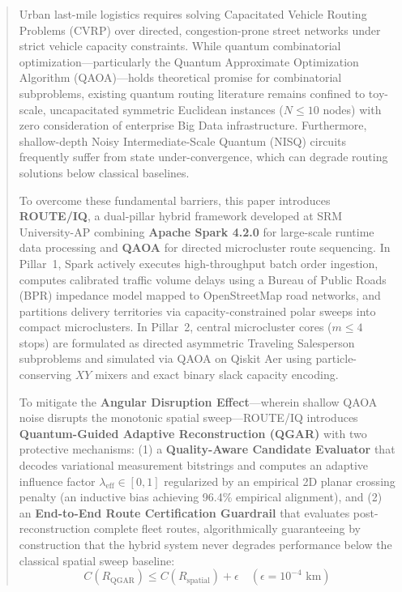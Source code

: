 \documentclass[journal,10pt]{IEEEtran}
\begin{document}
\begin{abstract}
Urban last-mile logistics requires solving Capacitated Vehicle Routing Problems (CVRP) over directed, congestion-prone street networks under strict vehicle capacity constraints. While quantum combinatorial optimization---particularly the Quantum Approximate Optimization Algorithm (QAOA)---holds theoretical promise for combinatorial subproblems, existing quantum routing literature remains confined to toy-scale, uncapacitated symmetric Euclidean instances ($N \le 10$ nodes) with zero consideration of enterprise Big Data infrastructure. Furthermore, shallow-depth Noisy Intermediate-Scale Quantum (NISQ) circuits frequently suffer from state under-convergence, which can degrade routing solutions below classical baselines. 

To overcome these fundamental barriers, this paper introduces \textbf{ROUTE/IQ}, a dual-pillar hybrid framework developed at SRM University-AP combining \textbf{Apache Spark 4.2.0} for large-scale runtime data processing and \textbf{QAOA} for directed microcluster route sequencing. In Pillar~1, Spark actively executes high-throughput batch order ingestion, computes calibrated traffic volume delays using a Bureau of Public Roads (BPR) impedance model mapped to OpenStreetMap road networks, and partitions delivery territories via capacity-constrained polar sweeps into compact microclusters. In Pillar~2, central microcluster cores ($m \le 4$ stops) are formulated as directed asymmetric Traveling Salesperson subproblems and simulated via QAOA on Qiskit Aer using particle-conserving $XY$ mixers and exact binary slack capacity encoding. 

To mitigate the \textbf{Angular Disruption Effect}---wherein shallow QAOA noise disrupts the monotonic spatial sweep---ROUTE/IQ introduces \textbf{Quantum-Guided Adaptive Reconstruction (QGAR)} with two protective mechanisms: (1) a \textbf{Quality-Aware Candidate Evaluator} that decodes variational measurement bitstrings and computes an adaptive influence factor $\lambda_{\text{eff}} \in [0, 1]$ regularized by an empirical 2D planar crossing penalty (an inductive bias achieving 96.4\% empirical alignment), and (2) an \textbf{End-to-End Route Certification Guardrail} that evaluates post-reconstruction complete fleet routes, algorithmically guaranteeing by construction that the hybrid system never degrades performance below the classical spatial sweep baseline:
\[
C(R_{\text{QGAR}}) \le C(R_{\text{spatial}}) + \epsilon \quad (\epsilon = 10^{-4}\text{ km})
\]


\end{abstract}
\end{document}
